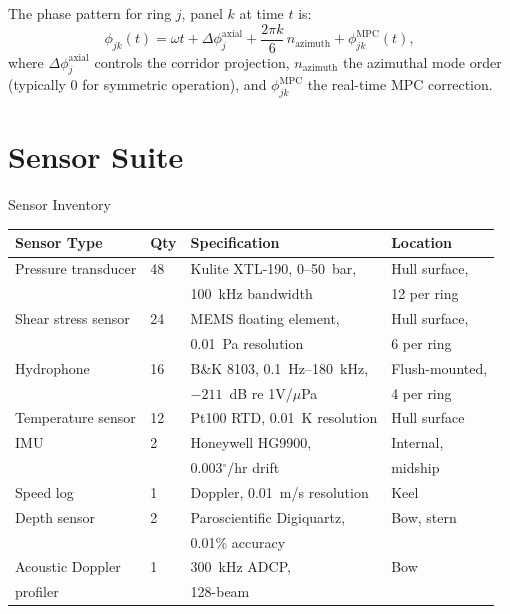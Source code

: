 \documentclass[11pt]{article}
\begin{document}
The phase pattern for ring $j$, panel $k$ at time $t$ is:
\begin{equation}
\phi_{jk}(t) = \omega t + \Delta\phi_j^\mathrm{axial}
+ \frac{2\pi k}{6}\,n_\mathrm{azimuth}
+ \phi_{jk}^\mathrm{MPC}(t),
\end{equation}
where $\Delta\phi_j^\mathrm{axial}$ controls the corridor projection,
$n_\mathrm{azimuth}$ the azimuthal mode order (typically 0 for symmetric
operation), and $\phi_{jk}^\mathrm{MPC}$ the real-time MPC correction.

\section{Sensor Suite}
\label{sec:sensors}

\begin{specbox}{Sensor Inventory}
\begin{longtable}{@{}llll@{}}
\toprule
\textbf{Sensor Type} & \textbf{Qty} & \textbf{Specification} & \textbf{Location} \\
\midrule
\endhead
Pressure transducer & 48 & Kulite XTL-190, 0--50~bar, & Hull surface, \\
 & & 100~kHz bandwidth & 12 per ring \\
\addlinespace
Shear stress sensor & 24 & MEMS floating element, & Hull surface, \\
 & & 0.01~Pa resolution & 6 per ring \\
\addlinespace
Hydrophone & 16 & B\&K 8103, 0.1~Hz--180~kHz, & Flush-mounted, \\
 & & $-211$~dB re 1V/$\mu$Pa & 4 per ring \\
\addlinespace
Temperature sensor & 12 & Pt100 RTD, 0.01~K resolution & Hull surface \\
\addlinespace
IMU & 2 & Honeywell HG9900, & Internal, \\
 & & 0.003$^\circ$/hr drift & midship \\
\addlinespace
Speed log & 1 & Doppler, 0.01~m/s resolution & Keel \\
\addlinespace
Depth sensor & 2 & Paroscientific Digiquartz, & Bow, stern \\
 & & 0.01\% accuracy & \\
\addlinespace
Acoustic Doppler & 1 & 300~kHz ADCP, & Bow \\
profiler & & 128-beam & \\
\bottomrule
\end{longtable}
\end{specbox}
\end{document}
